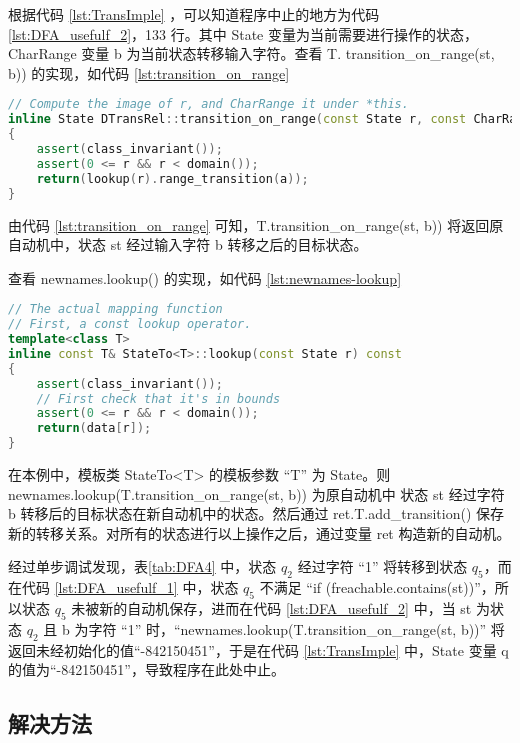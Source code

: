 根据代码 \ref{lst:TransImple} ，可以知道程序中止的地方为代码 \ref{lst:DFA_usefulf_2}，133 行。其中 State 变量为当前需要进行操作的状态，CharRange 变量 b 为当前状态转移输入字符。查看 T.
transition\_on\_range(st, b)) 的实现，如代码 \ref{lst:transition_on_range}
\lstset{style=mystyle}
\begin{lstlisting}[language=C++,label={lst:transition_on_range},caption={ DTransRel.cpp },firstnumber=108]
// Compute the image of r, and CharRange it under *this.
inline State DTransRel::transition_on_range(const State r, const CharRange a) const
{
    assert(class_invariant());
    assert(0 <= r && r < domain());
    return(lookup(r).range_transition(a));
}
\end{lstlisting}
由代码 \ref{lst:transition_on_range} 可知，T.transition\_on\_range(st, b)) 将返回原自动机中，状态 st 经过输入字符 b 转移之后的目标状态。

查看 newnames.lookup() 的实现，如代码 \ref{lst:newnames-lookup}
\lstset{style=mystyle}
\begin{lstlisting}[language=C++,label={lst:newnames-lookup},caption={ StateTo.h },firstnumber=177]
// The actual mapping function
// First, a const lookup operator.
template<class T>
inline const T& StateTo<T>::lookup(const State r) const
{
    assert(class_invariant());
    // First check that it's in bounds
    assert(0 <= r && r < domain());
    return(data[r]);
}
\end{lstlisting}
在本例中，模板类 StateTo<T> 的模板参数 “T” 为 State。则 newnames.lookup(T.transition\_on\_range(st, b)) 为原自动机中 状态 st 经过字符 b 转移后的目标状态在新自动机中的状态。然后通过 ret.T.add\_transition() 保存新的转移关系。对所有的状态进行以上操作之后，通过变量 ret 构造新的自动机。 

经过单步调试发现，表\ref{tab:DFA4} 中，状态 $q_2$ 经过字符 “1” 将转移到状态 $q_5$，而在代码 \ref{lst:DFA_usefulf_1} 中，状态 $q_5$ 不满足 “if (freachable.contains(st))”，所以状态 $q_5$ 未被新的自动机保存，进而在代码 \ref{lst:DFA_usefulf_2} 中，当 st 为状态 $q_2$ 且 b 为字符 “1” 时，“newnames.lookup(T.transition\_on\_range(st, b))” 将返回未经初始化的值“-842150451”，于是在代码 \ref{lst:TransImple} 中，State 变量 q 的值为“-842150451”，导致程序在此处中止。

\subsection{解决方法}

